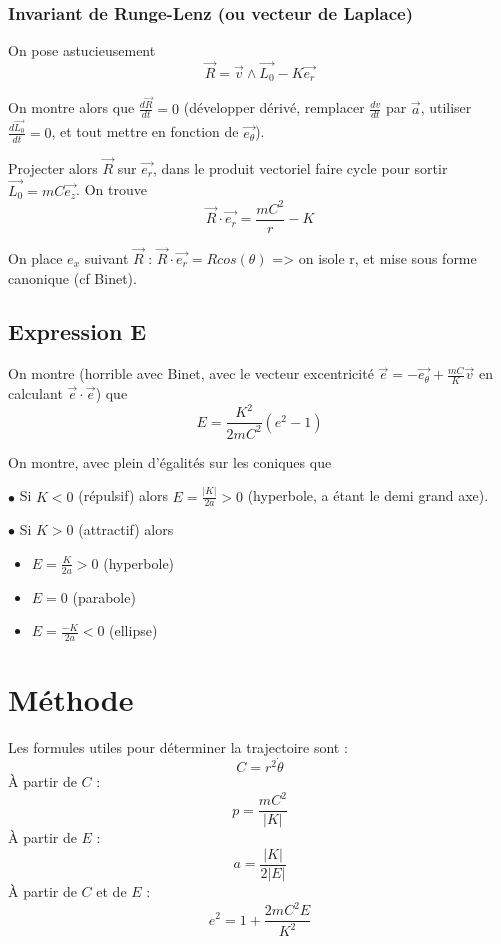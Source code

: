 \documentclass[9pt]{article}
\begin{document}
\begin{multicols*}{2}
\subsubsection{Invariant de Runge-Lenz (ou vecteur de Laplace)}

On pose astucieusement $$\overrightarrow{R} = \overrightarrow{v} \wedge \overrightarrow{L_0} - K \overrightarrow{e_r}$$

On montre alors que $\frac{d \overrightarrow{R} }{dt} = 0$ (développer dérivé, remplacer $\frac{dv}{dt} $ par $\overrightarrow{a} $, utiliser $\frac{d \overrightarrow{L_0} }{dt} = 0$, et tout mettre en fonction de $\overrightarrow{e_\theta}$).

Projecter alors $\overrightarrow{R}$ sur $\overrightarrow{e_r} $, dans le produit vectoriel faire cycle pour sortir $\overrightarrow{L_0} = mC \overrightarrow{e_z} $. On trouve
$$\overrightarrow{R} \cdot \overrightarrow{e_r} = \frac{mC^2}{r} - K$$

On place $e_x$ suivant $\overrightarrow{R}$ : $\overrightarrow{R} \cdot \overrightarrow{e_r} = R cos(\theta)$ => on isole r, et mise sous forme canonique (cf Binet).

\subsection{Expression E}

On montre (horrible avec Binet, avec le vecteur excentricité $\overrightarrow{e} = -\overrightarrow{e_\theta} + \frac{mC}{K} \overrightarrow{v} $ en calculant $\overrightarrow{e} \cdot \overrightarrow{e} $) que
$$E = \frac{K^2}{2mC^2} (e^2 - 1)$$

On montre, avec plein d'égalités sur les coniques que 

$\bullet$ Si $ K < 0 $ (répulsif) alors $E = \frac{|K|}{2a} > 0$ (hyperbole, a étant le demi grand axe).

$\bullet$ Si $ K > 0 $ (attractif) alors
\begin{itemize}
  \item $E = \frac{K}{2a} > 0$ (hyperbole)
  \item $E = 0 $ (parabole)
  \item $E = \frac{-K}{2a} < 0$ (ellipse)
\end{itemize}

\section{Méthode}
Les formules utiles pour déterminer la trajectoire sont :
$$C = r^2 \dot{\theta} $$
À partir de $C$ :
$$p = \frac{mC^2}{|K|} $$
À partir de $E$ :
$$a = \frac{|K|}{2|E|}$$
À partir de $C$ et de $E$ :
$$e^2 = 1 + \frac{2mC^2E}{K^2}$$


\end{multicols*}
\end{document}
